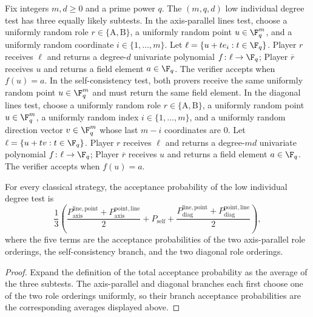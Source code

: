\begin{definition}\label{def:low-individual-degree-test}
	\leanok
	Fix integers $m,d \ge 0$ and a prime power $q$. The $(m,q,d)$ low individual degree test has three equally likely subtests.
	In the axis-parallel lines test, choose a uniformly random role $r \in \{\mathrm A,\mathrm B\}$, a uniformly random point $u \in \F_q^m$, and a uniformly random coordinate $i \in \{1,\dots,m\}$. Let $\ell=\{u+t e_i : t \in \F_q\}$. Player $r$ receives $\ell$ and returns a degree-$d$ univariate polynomial $f\colon \ell \to \F_q$; Player $\overline r$ receives $u$ and returns a field element $a \in \F_q$. The verifier accepts when $f(u)=a$.
	In the self-consistency test, both provers receive the same uniformly random point $u \in \F_q^m$ and must return the same field element.
	In the diagonal lines test, choose a uniformly random role $r \in \{\mathrm A,\mathrm B\}$, a uniformly random point $u \in \F_q^m$, a uniformly random index $i \in \{1,\dots,m\}$, and a uniformly random direction vector $v \in \F_q^m$ whose last $m-i$ coordinates are $0$. Let $\ell=\{u+t v : t \in \F_q\}$. Player $r$ receives $\ell$ and returns a degree-$md$ univariate polynomial $f\colon \ell \to \F_q$; Player $\overline r$ receives $u$ and returns a field element $a \in \F_q$. The verifier accepts when $f(u)=a$.
\end{definition}

\begin{lemma}\label{fig:test}
	\leanok
	For every classical strategy, the acceptance probability of the low individual degree test is
	\[
		\frac13\left(\frac{P^{\mathrm{line,point}}_{\mathrm{axis}}+P^{\mathrm{point,line}}_{\mathrm{axis}}}{2}
		+P_{\mathrm{self}}
		+\frac{P^{\mathrm{line,point}}_{\mathrm{diag}}+P^{\mathrm{point,line}}_{\mathrm{diag}}}{2}\right),
	\]
	where the five terms are the acceptance probabilities of the two axis-parallel role orderings, the self-consistency branch, and the two diagonal role orderings.
\end{lemma}
\begin{proof}
	\leanok
	Expand the definition of the total acceptance probability as the average of
	the three subtests.  The axis-parallel and diagonal branches each first
	choose one of the two role orderings uniformly, so their branch acceptance
	probabilities are the corresponding averages displayed above.
\end{proof}

